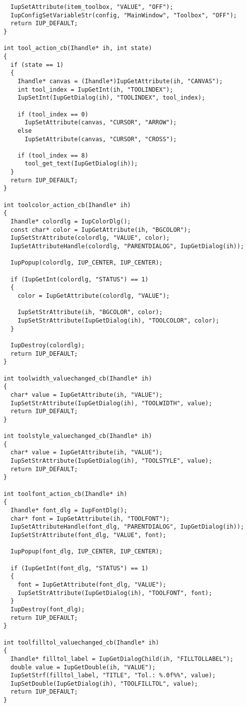 \documentclass{ctexart}
\begin{document}
\begin{lstlisting}
  IupSetAttribute(item_toolbox, "VALUE", "OFF");
  IupConfigSetVariableStr(config, "MainWindow", "Toolbox", "OFF");
  return IUP_DEFAULT;
}

int tool_action_cb(Ihandle* ih, int state)
{
  if (state == 1)
  {
    Ihandle* canvas = (Ihandle*)IupGetAttribute(ih, "CANVAS");
    int tool_index = IupGetInt(ih, "TOOLINDEX");
    IupSetInt(IupGetDialog(ih), "TOOLINDEX", tool_index);

    if (tool_index == 0)
      IupSetAttribute(canvas, "CURSOR", "ARROW");
    else
      IupSetAttribute(canvas, "CURSOR", "CROSS");

    if (tool_index == 8)
      tool_get_text(IupGetDialog(ih));
  }
  return IUP_DEFAULT;
}

int toolcolor_action_cb(Ihandle* ih)
{
  Ihandle* colordlg = IupColorDlg();
  const char* color = IupGetAttribute(ih, "BGCOLOR");
  IupSetStrAttribute(colordlg, "VALUE", color);
  IupSetAttributeHandle(colordlg, "PARENTDIALOG", IupGetDialog(ih));

  IupPopup(colordlg, IUP_CENTER, IUP_CENTER);

  if (IupGetInt(colordlg, "STATUS") == 1)
  {
    color = IupGetAttribute(colordlg, "VALUE");

    IupSetStrAttribute(ih, "BGCOLOR", color);           
    IupSetStrAttribute(IupGetDialog(ih), "TOOLCOLOR", color);
  }

  IupDestroy(colordlg);
  return IUP_DEFAULT;
}

int toolwidth_valuechanged_cb(Ihandle* ih)
{
  char* value = IupGetAttribute(ih, "VALUE");
  IupSetStrAttribute(IupGetDialog(ih), "TOOLWIDTH", value);
  return IUP_DEFAULT;
}

int toolstyle_valuechanged_cb(Ihandle* ih)
{
  char* value = IupGetAttribute(ih, "VALUE");
  IupSetStrAttribute(IupGetDialog(ih), "TOOLSTYLE", value);
  return IUP_DEFAULT;
}

int toolfont_action_cb(Ihandle* ih)
{
  Ihandle* font_dlg = IupFontDlg();
  char* font = IupGetAttribute(ih, "TOOLFONT");
  IupSetAttributeHandle(font_dlg, "PARENTDIALOG", IupGetDialog(ih));
  IupSetStrAttribute(font_dlg, "VALUE", font);

  IupPopup(font_dlg, IUP_CENTER, IUP_CENTER);

  if (IupGetInt(font_dlg, "STATUS") == 1)
  {
    font = IupGetAttribute(font_dlg, "VALUE");
    IupSetStrAttribute(IupGetDialog(ih), "TOOLFONT", font);
  }
  IupDestroy(font_dlg);
  return IUP_DEFAULT;
}

int toolfilltol_valuechanged_cb(Ihandle* ih)
{
  Ihandle* filltol_label = IupGetDialogChild(ih, "FILLTOLLABEL");
  double value = IupGetDouble(ih, "VALUE");
  IupSetStrf(filltol_label, "TITLE", "Tol.: %.0f%%", value);
  IupSetDouble(IupGetDialog(ih), "TOOLFILLTOL", value);
  return IUP_DEFAULT;
}


\end{lstlisting}
\end{document}
